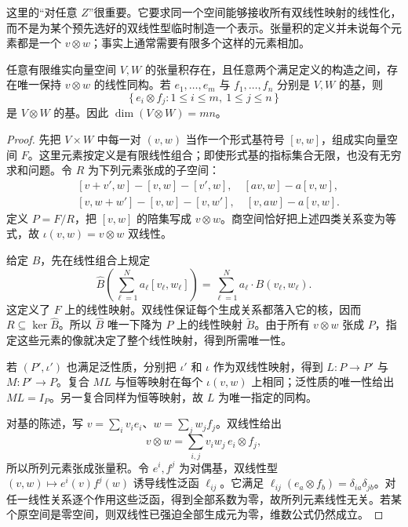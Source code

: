 这里的“对任意 \(Z\)”很重要。它要求同一个空间能够接收所有双线性映射的线性化，而不是为某个预先选好的双线性型临时制造一个表示。张量积的定义并未说每个元素都是一个 \(v\otimes w\)；事实上通常需要有限多个这样的元素相加。

\begin{theorem}[张量积的构造与唯一性]\label{b1:thm:app-b-tensor-construction}
任意有限维实向量空间 \(V,W\) 的张量积存在，且任意两个满足定义的构造之间，存在唯一保持 \(v\otimes w\) 的线性同构。若 \(e_1,\ldots,e_m\) 与 \(f_1,\ldots,f_n\) 分别是 \(V,W\) 的基，则
\[
 \{\,e_i\otimes f_j:1\leq i\leq m,\ 1\leq j\leq n\,\}
\]
是 \(V\otimes W\) 的基。因此 \(\dim(V\otimes W)=mn\)。
\end{theorem}
\begin{proof}
先把 \(V\times W\) 中每一对 \((v,w)\) 当作一个形式基符号 \([v,w]\)，组成实向量空间 \(F\)。这里元素按定义是有限线性组合；即使形式基的指标集合无限，也没有无穷求和问题。令 \(R\) 为下列元素张成的子空间：
\[
 \begin{aligned}
 &[v+v',w]-[v,w]-[v',w],\quad [av,w]-a[v,w],\\
 &[v,w+w']-[v,w]-[v,w'],\quad [v,aw]-a[v,w].
 \end{aligned}
\]
定义 \(P=F/R\)，把 \([v,w]\) 的陪集写成 \(v\otimes w\)。商空间恰好把上述四类关系变为等式，故 \(\iota(v,w)=v\otimes w\) 双线性。

给定 \(B\)，先在线性组合上规定
\[
 \widehat B\left(\sum_{\ell=1}^N a_\ell[v_\ell,w_\ell]\right)
   =\sum_{\ell=1}^N a_\ell \cdot B(v_\ell,w_\ell).
\]
这定义了 \(F\) 上的线性映射。双线性保证每个生成关系都落入它的核，因而 \(R\subseteq\ker\widehat B\)。所以 \(\widehat B\) 唯一下降为 \(P\) 上的线性映射 \(\widetilde B\)。由于所有 \(v\otimes w\) 张成 \(P\)，指定这些元素的像就决定了整个线性映射，得到所需唯一性。

若 \((P',\iota')\) 也满足泛性质，分别把 \(\iota'\) 和 \(\iota\) 作为双线性映射，得到 \(L:P\rightarrow P'\) 与 \(M:P'\rightarrow P\)。复合 \(ML\) 与恒等映射在每个 \(\iota(v,w)\) 上相同；泛性质的唯一性给出 \(ML=I_P\)。另一复合同样为恒等映射，故 \(L\) 为唯一指定的同构。

对基的陈述，写 \(v=\sum_i v_i e_i\)、\(w=\sum_jw_jf_j\)。双线性给出
\[
 v\otimes w=\sum_{i,j}v_iw_j\,e_i\otimes f_j,
\]
所以所列元素张成张量积。令 \(e^i,f^j\) 为对偶基，双线性型
\((v,w)\mapsto e^i(v)f^j(w)\) 诱导线性泛函 \(\ell_{ij}\)。它满足
\(\ell_{ij}(e_a\otimes f_b)=\delta_{ia}\delta_{jb}\)。对任一线性关系逐个作用这些泛函，得到全部系数为零，故所列元素线性无关。若某个原空间是零空间，则双线性已强迫全部生成元为零，维数公式仍然成立。
\end{proof}

